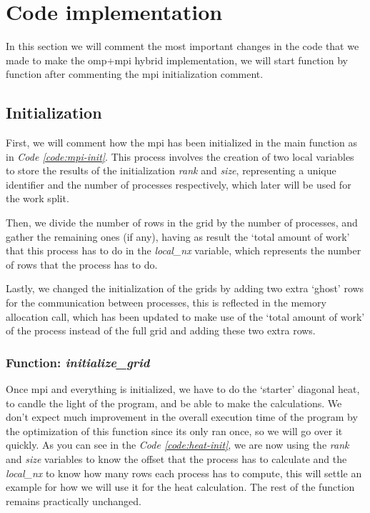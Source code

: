 \documentclass[../main.tex]{subfiles}
\begin{document}
\section{Code implementation}

In this section we will comment the most important changes in the code that we made to make the \acrshort{omp}+\acrshort{mpi} hybrid implementation, we will start function by function after commenting the \acrshort{mpi} initialization comment.

\subsection{Initialization}

First, we will comment how the \acrshort{mpi} has been initialized in the main function as in \textit{Code \ref{code:mpi-init}}.
This process involves the creation of two local variables to store the results of the initialization \textit{rank} and \textit{size}, representing a unique identifier and the number of processes respectively, which later will be used for the work split.

Then, we divide the number of rows in the grid by the number of processes, and gather the remaining ones (if any), having as result the `total amount of work' that this process has to do in the \textit{local\_nx} variable, which represents the number of rows that the process has to do.

Lastly, we changed the initialization of the grids by adding two extra `ghost' rows for the communication between processes, this is reflected in the memory allocation call, which has been updated to make use of the `total amount of work' of the process instead of the full grid and adding these two extra rows.

\subsubsection{Function: \textit{initialize\_grid}}

Once \acrshort{mpi} and everything is initialized, we have to do the `starter' diagonal heat, to candle the light of the program, and be able to make the calculations. We don't expect much improvement in the overall execution time of the program by the optimization of this function since its only ran once, so we will go over it quickly.
As you can see in the \textit{Code \ref{code:heat-init}}, we are now using the \textit{rank} and \textit{size} variables to know the offset that the process has to calculate and the \textit{local\_nx} to know how many rows each process has to compute, this will settle an example for how we will use it for the heat calculation. The rest of the function remains practically unchanged.
\end{document}
